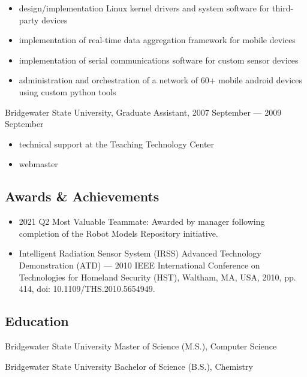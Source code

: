 \documentclass[letterpaper,12pt]{article}
\begin{document}
\begin{itemize}
\item design/implementation Linux kernel drivers and system software for
  third-party devices
\item implementation of real-time data aggregation framework for mobile devices
\item implementation of serial communications software for custom sensor devices
\item administration and orchestration of a network of 60+ mobile android devices using custom python tools
\end{itemize}

Bridgewater State University, Graduate Assistant, 2007 September --- 2009 September

\begin{itemize}
\item technical support at the Teaching Technology Center
\item webmaster
\end{itemize}

\subsection*{Awards \& Achievements}

\begin{itemize}
\item 2021 Q2 Most Valuable Teammate: Awarded by manager following completion
  of the Robot Models Repository initiative.
\item Intelligent Radiation Sensor System (IRSS) Advanced Technology
  Demonstration (ATD) --- 2010 IEEE International Conference on Technologies
  for Homeland Security (HST), Waltham, MA, USA, 2010, pp. 414, doi:
  10.1109/THS.2010.5654949.
\end{itemize}

\subsection*{Education}

Bridgewater State University
Master of Science (M.S.), Computer Science

Bridgewater State University
Bachelor of Science (B.S.), Chemistry
\end{document}
